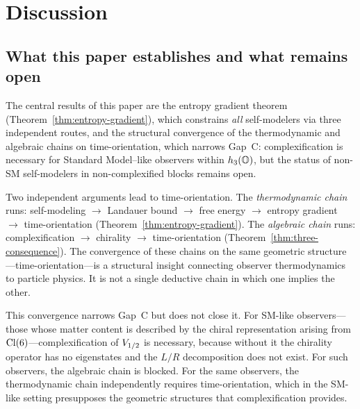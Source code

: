 
\section{Discussion}\label{sec:discussion}

\subsection{What this paper establishes and what remains open}
\label{sec:resolves}

The central results of this paper are the entropy gradient theorem
(Theorem~\ref{thm:entropy-gradient}), which constrains \emph{all}
self-modelers via three independent routes, and the structural
convergence of the thermodynamic and algebraic chains on
time-orientation, which narrows Gap~C: complexification is necessary
for Standard Model--like observers within $h_3(\mathbb{O})$, but the status of
non-SM self-modelers in non-complexified blocks remains open.

Two independent arguments lead to time-orientation.  The
\emph{thermodynamic chain} runs: self-modeling $\to$ Landauer bound
$\to$ free energy $\to$ entropy gradient $\to$ time-orientation
(Theorem~\ref{thm:entropy-gradient}).  The \emph{algebraic chain}
runs: complexification $\to$ chirality $\to$ time-orientation
(Theorem~\ref{thm:three-consequence}).  The convergence of these
chains on the same geometric structure---time-orientation---is a
structural insight connecting observer thermodynamics to particle
physics.  It is not a single deductive chain in which one implies the
other.

This convergence narrows Gap~C but does not close it.  For SM-like
observers---those whose matter content is described by the chiral
representation arising from $\mathrm{Cl}(6)$---complexification of $V_{1/2}$ is
necessary, because without it the chirality operator has no
eigenstates and the $L/R$ decomposition does not exist.  For such
observers, the algebraic chain is blocked.  For the same observers,
the thermodynamic chain independently requires time-orientation,
which in the SM-like setting presupposes the geometric structures that
complexification provides.


